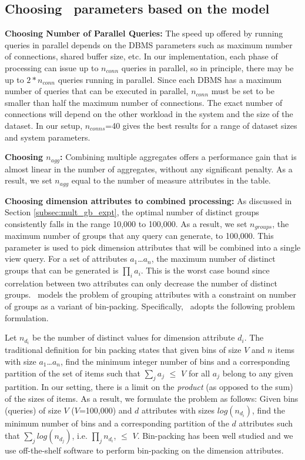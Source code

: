 \subsection{Choosing \SeeDB\ parameters based on the model}

{\bf Choosing Number of Parallel Queries:} The speed up offered by running
queries in parallel depends on the DBMS parameters such as maximum number of
connections, shared buffer size, etc. In our implementation, each phase of
processing can issue up to $n_{conn}$ queries in parallel, so in principle,
there may be up to $2 \ast n_{conn}$ queries running in parallel. Since each
DBMS has a maximum number of queries that can be executed in parallel,
$n_{conn}$ must be set to be smaller than half the maximum number of
connections. The exact number of connections will depend on the other workload
in the system and the size of the dataset. In our setup, $n_{conns}$=40 gives
the best results for a range of dataset sizes and system parameters.

{\bf Choosing $n_{agg}$:} Combining multiple aggregates offers a performance
gain that is almost linear in the number of aggregates, without any significant
penalty. As a result, we set $n_{agg}$ equal to the number of measure attributes
in the table.

{\bf Choosing dimension attributes to combined processing:}  As discussed in
Section \ref{subsec:mult_gb_expt}, the optimal number of distinct groups
consistently falls in the range 10,000 to 100,000. As a result, we set
$n_{groups}$, the maximum number of groups that any query can generate, to
100,000.
This parameter is used to pick dimension attributes that will be combined into a
single view query. For a set of attributes $a_1$\ldots$a_n$, the maximum number
of distinct groups that can be generated is $\prod_i a_i$. This is the worst
case bound since correlation between two attributes can only decrease the number
of distinct groups. \SeeDB\ models the problem of grouping attributes with a
constraint on number of groups as a variant of bin-packing.
Specifically, \SeeDB\ adopts the following problem formulation.

Let $n_{d_{i}}$ be the number of distinct values for dimension attribute $d_i$.
The traditional definition for bin packing states that given bins of size $V$
and $n$ items with size $a_1$\ldots$a_n$, find the minimum integer number of
bins and a corresponding partition of the set of items such that $\sum_{j} a_j$
$\leq$ $V$ for all $a_j$ belong to any given partition. In our setting, there is
a limit on the {\it product} (as opposed to the sum) of the sizes of items. As a
result, we formulate the problem as follows: Given bins (queries) of size $V$
($V$=100,000) and $d$ attributes with sizes $log(n_{d_{i}})$, find
the minimum number of bins and a corresponding partition of the $d$ attributes
such that $\sum_{j} log(n_{d_{j}})$, i.e. $\prod_{j} n_{d_{i}}$, $\leq$ $V$.
Bin-packing has been well studied and we use off-the-shelf software
\cite{glpk} to perform bin-packing on the dimension attributes.

